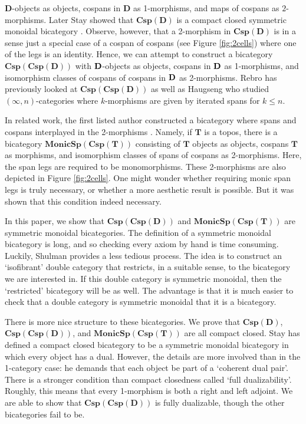 \documentclass[11pt]{amsart}
\newcommand{\cat}[1]{\mathbf{#1}}
\newcommand{\bicspmap}[1]{\mathbf{Csp(#1)}}
\newcommand{\bicspcsp}[1]{\mathbf{Csp(Csp(#1))}}
\newcommand{\bimonspcsp}[1]{\mathbf{MonicSp(Csp(#1))}}
\theoremstyle{remark}
\theoremstyle{definition}
\begin{document}
$\cat{D}$-objects as objects, 
cospans in $\cat{D}$ as 1-morphisms, and 
maps of cospans as $2$-morphisms. 
Later Stay showed that $\bicspmap{D}$ is a compact closed symmetric monoidal bicategory \cite{Stay}.
Observe, however, that a 2-morphism in $\bicspmap{D}$ is in a sense 
just a special case of 
a cospan of cospans (see Figure \ref{fig:2cells}) 
where one of the legs is an identity. 
Hence,
we can attempt to construct a bicategory $\bicspcsp{D}$ with $\bold{D}$-objects as objects, cospans 
in $\bold{D}$ as 1-morphisms, and isomorphism classes of cospans of cospans in $\bold{D}$ as 2-morphisms.
Rebro \cite{Reb} has previously looked at $\bicspcsp{D}$ as well as
Haugseng \cite{Haug} who studied $(\infty, n)$-categories where
$k$-morphisms are given by iterated spans for $k \leq n$.  

In related work, the first listed author constructed a bicategory
where spans and cospans interplayed in the 2-morphisms
	\cite{Cic}. 
Namely, if $\cat{T}$ is a topos, 
there is a bicategory $\bimonspcsp{T}$ consisting of 
$\cat{T}$ objects as objects, 
cospans $\cat{T}$ as morphisms, and 
isomorphism classes of spans of cospans as 2-morphisms. 
Here, the span legs are 
required to be monomorphisms. 
These 2-morphisms are also depicted in Figure \ref{fig:2cells}. 
One might wonder whether requiring monic span legs is truly necessary,
or whether a more aesthetic result is possible. 
But it was shown that this condition indeed necessary. 

In this paper, we show that $\bicspcsp{D}$ and $\bimonspcsp{T}$ 
are symmetric monoidal bicategories. 
The definition of a symmetric monoidal bicategory is long, 
and so checking every axiom by hand is time consuming. 
Luckily, Shulman 
	\cite{Shul} 
provides a less tedious process. 
The idea is to construct an `isofibrant' double category that restricts, 
in a suitable sense, to the bicategory we are interested in.  
If this double category is symmetric monoidal, 
then the `restricted' bicategory will be as well.  
The advantage is that it is much easier to check that a double category is symmetric monoidal that it is a bicategory.

There is more nice structure to these bicategories.
We prove that $\bicspmap{D}$, $\bicspcsp{D}$, and $\bimonspcsp{T}$ 
are all compact closed.
Stay \cite{Stay} has defined a compact closed bicategory 
to be a symmetric monoidal bicategory in which every object has a dual. However, the details are more involved than in the 1-category case: he demands
that each object be part of a `coherent dual pair'.  
There is a stronger condition than compact closedness called `full dualizability'.
Roughly, this means that every 1-morphism is both a right and left adjoint.  
We are able to show that $\bicspcsp{D}$ is fully dualizable,
though the other bicategories fail to be.
\end{document}

